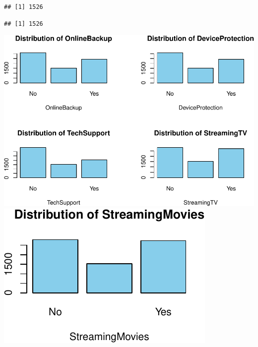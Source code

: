 \documentclass[
  twoside]{article}
\newenvironment{Shaded}{\begin{snugshade}}{\end{snugshade}}
\newcommand{\CommentTok}[1]{\textcolor[rgb]{0.56,0.35,0.01}{\textit{#1}}}
\newcommand{\FunctionTok}[1]{\textcolor[rgb]{0.00,0.00,0.00}{#1}}
\newcommand{\NormalTok}[1]{#1}
\newcommand{\SpecialCharTok}[1]{\textcolor[rgb]{0.00,0.00,0.00}{#1}}
\newcommand{\StringTok}[1]{\textcolor[rgb]{0.31,0.60,0.02}{#1}}
\begin{document}
\begin{Shaded}
\end{Shaded}

\begin{verbatim}
## [1] 1526
\end{verbatim}

\begin{Shaded}
\end{Shaded}

\begin{verbatim}
## [1] 1526
\end{verbatim}

\includegraphics{Assigment2_files/figure-latex/unnamed-chunk-28-1.pdf}
\includegraphics{Assigment2_files/figure-latex/unnamed-chunk-28-2.pdf}
\end{document}
